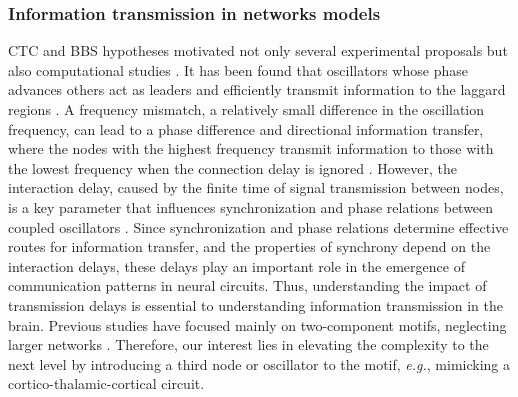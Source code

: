 \documentclass[../main.tex]{subfiles}
\begin{document}
\subsubsection{Information transmission in networks models}
CTC and BBS hypotheses motivated not only several experimental proposals \citep{bosman2012attentional,doi:10.1146/annurev.neuro.051508.135603,doi:10.1177/0959354307083492,MisselhornENEURO.0101-19.2019} but also computational studies \citep{battaglia_dynamic_2012,palmigiano_flexible_2017-1,pariz_high_2018, pariz_transmission_2021,vicente_dynamical_2008,gollo_dynamic_2010,gollo2011theta}.
It has been found that oscillators whose phase advances others act as leaders and efficiently transmit information to the laggard regions \citep{dalla2019exploring}.
A frequency mismatch, a relatively small difference in the oscillation frequency, can lead to a phase difference and directional information transfer, where the nodes with the highest frequency transmit information to those with the lowest frequency when the connection delay is ignored \citep{kirst_dynamic_2016,pariz_high_2018, pariz_transmission_2021}.
However, the interaction delay, caused by the finite time of signal transmission between nodes, is a key parameter that influences synchronization and phase relations between coupled oscillators 
\citep{ernst1995synchronization,ernst1998delay,yeung1999time,zeitler2009asymmetry,ko_phase-response_2009,esfahani_zero-lag_2014,mirasso_anticipated_2017}.
Since synchronization and phase relations determine effective routes for information transfer, and the properties of synchrony depend on the interaction delays, these delays play an important role in the emergence of communication patterns in neural circuits.
Thus, understanding the impact of transmission delays is essential to understanding information transmission in the brain.
Previous studies have focused mainly on two-component motifs, neglecting larger networks \citep{sancristobal_role_2014,barardi_phase-coherence_2014, kirst_dynamic_2016, palmigiano_flexible_2017-1, pariz_transmission_2021}.
Therefore, our interest lies in elevating the complexity to the next level by introducing a third node or oscillator to the motif, \textit{e.g.},  mimicking a cortico-thalamic-cortical circuit.
\end{document}
